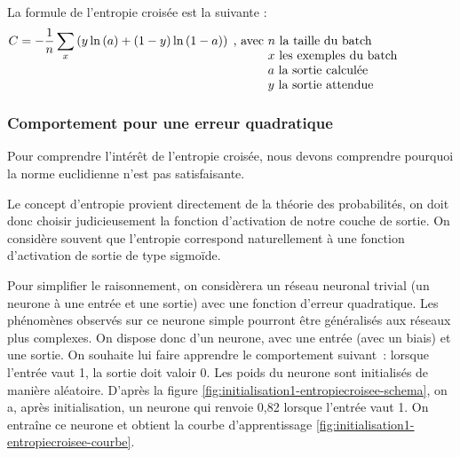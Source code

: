 La formule de l'entropie croisée est la suivante : 
\begin{equation}
 C = -\frac{1}{n}\sum_x\left(y\ln\left(a\right) + \left(1-y\right)\ln\left(1-a\right)\right)\; \text{, avec \parbox[t]{15em}{$n$ la taille du batch\\ $x$ les exemples du batch\\
 $a$ la sortie calculée\\$y$ la sortie attendue}}
 \label{eq:formule-entropiecroisee}
\end{equation}

\subsubsection{Comportement pour une erreur quadratique}

Pour comprendre l'intérêt de l'entropie croisée, nous devons comprendre pourquoi la norme euclidienne n'est pas satisfaisante.

Le concept d'entropie provient directement de la théorie des probabilités, on doit donc choisir judicieusement la fonction d'activation de notre couche de sortie. On considère souvent que l'entropie correspond naturellement à une fonction d'activation de sortie de type sigmoïde.

Pour simplifier le raisonnement, on considèrera un réseau neuronal trivial (un neurone à une entrée et une sortie) avec une fonction d'erreur quadratique.
Les phénomènes observés sur ce neurone simple pourront être généralisés aux réseaux plus complexes. On dispose donc d'un neurone, avec une entrée (avec un biais) et une sortie. On souhaite lui faire apprendre le comportement suivant~: lorsque l'entrée vaut 1, la sortie doit valoir 0.
Les poids du neurone sont initialisés de manière aléatoire. D'après la figure \ref{fig:initialisation1-entropiecroisee-schema}, on a, après initialisation, un neurone qui renvoie 0,82 lorsque l'entrée vaut 1. On entraîne ce neurone et obtient la courbe d'apprentissage \ref{fig:initialisation1-entropiecroisee-courbe}.


